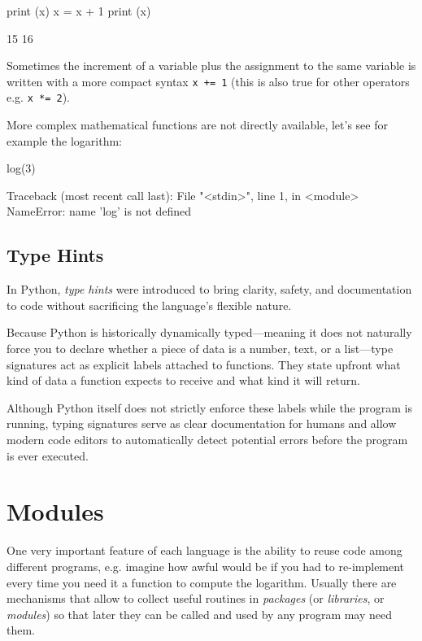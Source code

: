 \begin{ipythonnon}
print (x)
x = x + 1
print (x)	
\end{ipythonnon}
\begin{ioutput}
15
16
\end{ioutput}

Sometimes the increment of a variable plus the assignment to the same variable is written with a more compact syntax \texttt{x += 1} (this is also true for other operators e.g. \texttt{x *= 2}).

More complex mathematical functions are not directly available, let's see for example the logarithm:

\begin{ipythonnon}
log(3)
\end{ipythonnon}
\begin{ioutput}
Traceback (most recent call last):
  File "<stdin>", line 1, in <module>
NameError: name 'log' is not defined
\end{ioutput}

\subsection{Type Hints}

In Python, \textit{type hints} were introduced to bring clarity, safety, and documentation to code without sacrificing the language's flexible nature. 

Because Python is historically dynamically typed—meaning it does not naturally force you to declare whether a piece of data is a number, text, or a list—type signatures act as explicit labels attached to functions. They state upfront what kind of data a function expects to receive and what kind it will return. 

Although Python itself does not strictly enforce these labels while the program is running, typing signatures serve as clear documentation for humans and allow modern code editors to automatically detect potential errors before the program is ever executed.

\section{Modules}\label{modules}

One very important feature of each language is the ability to reuse code among different programs, e.g. imagine how awful would be if you had to re-implement every time you need it a function to compute the logarithm.
Usually there are mechanisms that allow to collect useful routines in \emph{packages} (or \emph{libraries}, or \emph{modules}) so that later they can be called and used by any program may need them.

